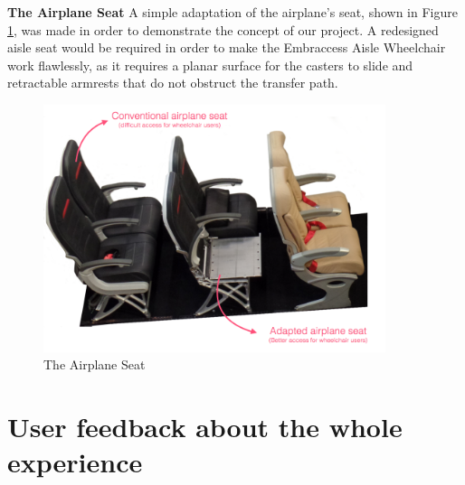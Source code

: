 \textbf{The Airplane Seat}
	A simple adaptation of the airplane's seat, shown in Figure \ref{fig:airplane}, was made in order to demonstrate the concept of our project. A redesigned aisle seat would be required in order to make the Embraccess Aisle Wheelchair work flawlessly, as it requires a planar surface for the casters to slide and retractable armrests that do not obstruct the transfer path.

\begin{figure}[h]
\centering
\includegraphics[width=10cm]{images/AisleWheelchair9.png}
\caption{The Airplane Seat}
\label{fig:airplane}
\end{figure}

\newpage

\section{User feedback about the whole experience}


